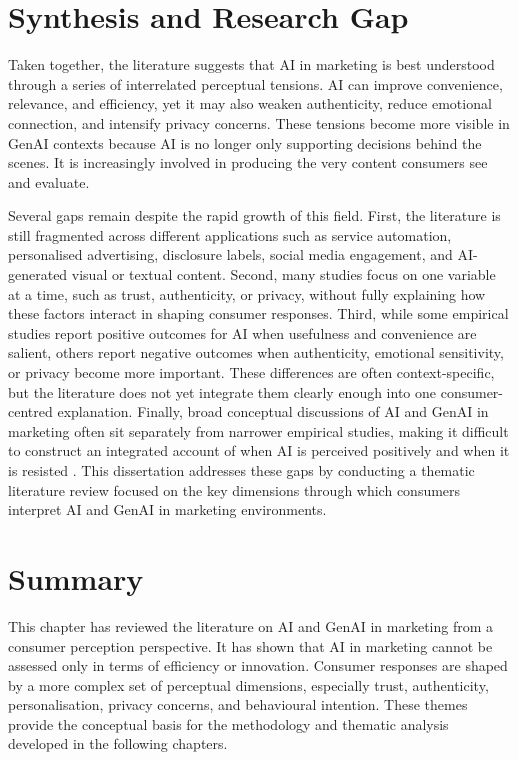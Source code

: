 \section{Synthesis and Research Gap}
Taken together, the literature suggests that AI in marketing is best understood through a series of interrelated perceptual tensions. AI can improve convenience, relevance, and efficiency, yet it may also weaken authenticity, reduce emotional connection, and intensify privacy concerns. These tensions become more visible in GenAI contexts because AI is no longer only supporting decisions behind the scenes. It is increasingly involved in producing the very content consumers see and evaluate.

Several gaps remain despite the rapid growth of this field. First, the literature is still fragmented across different applications such as service automation, personalised advertising, disclosure labels, social media engagement, and AI-generated visual or textual content. Second, many studies focus on one variable at a time, such as trust, authenticity, or privacy, without fully explaining how these factors interact in shaping consumer responses. Third, while some empirical studies report positive outcomes for AI when usefulness and convenience are salient, others report negative outcomes when authenticity, emotional sensitivity, or privacy become more important. These differences are often context-specific, but the literature does not yet integrate them clearly enough into one consumer-centred explanation. Finally, broad conceptual discussions of AI and GenAI in marketing often sit separately from narrower empirical studies, making it difficult to construct an integrated account of when AI is perceived positively and when it is resisted \cite{chan2025genai,puntoni2021experiential,ubal2024framework}. This dissertation addresses these gaps by conducting a thematic literature review focused on the key dimensions through which consumers interpret AI and GenAI in marketing environments.

\section{Summary}
This chapter has reviewed the literature on AI and GenAI in marketing from a consumer perception perspective. It has shown that AI in marketing cannot be assessed only in terms of efficiency or innovation. Consumer responses are shaped by a more complex set of perceptual dimensions, especially trust, authenticity, personalisation, privacy concerns, and behavioural intention. These themes provide the conceptual basis for the methodology and thematic analysis developed in the following chapters.
